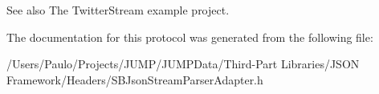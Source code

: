 \begin{DoxySeeAlso}{See also}
The TwitterStream example project. 
\end{DoxySeeAlso}


The documentation for this protocol was generated from the following file:\begin{DoxyCompactItemize}
\item 
/Users/Paulo/Projects/JUMP/JUMPData/Third-\/Part Libraries/JSON Framework/Headers/SBJsonStreamParserAdapter.h\end{DoxyCompactItemize}
